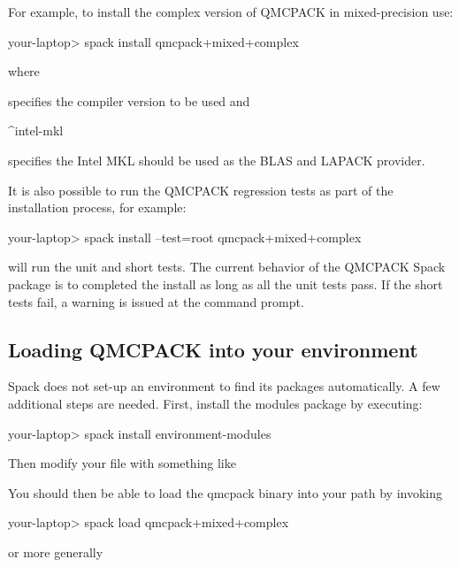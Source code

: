 For example, to install the complex version of QMCPACK in mixed-precision use:

\begin{shade}
your-laptop> spack install qmcpack+mixed+complex%
\end{shade}
where

\begin{shade}
\end{shade}
specifies the compiler version to be used and

\begin{shade}
^intel-mkl
\end{shade}
specifies the Intel MKL should be used as the BLAS and LAPACK provider.

It is also possible to run the QMCPACK regression tests as part of the
installation process, for example:

\begin{shade}
your-laptop> spack install --test=root qmcpack+mixed+complex%
\end{shade}
will run the unit and short tests. The current behavior of the QMCPACK
Spack package is to completed the install as long as all the unit tests
pass. If the short tests fail, a warning is issued at the command prompt.

\subsection{Loading QMCPACK into your environment}
Spack does not set-up an environment to find its packages
automatically. A few additional steps are needed. First, install the
modules package by executing:

\begin{shade}
your-laptop> spack install environment-modules
\end{shade}

Then modify your  file with something like


You should then be able to load the qmcpack binary into your path by
invoking

\begin{shade}
your-laptop> spack load qmcpack+mixed+complex%
\end{shade}
or more generally

